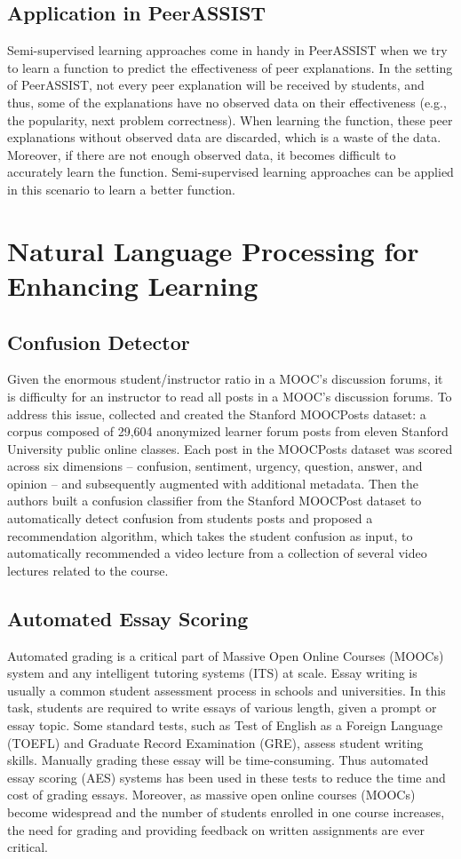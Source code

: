 \documentclass{article}
\begin{document}
\subsection{Application in PeerASSIST}
Semi-supervised learning approaches come in handy in PeerASSIST when
we try to learn a function to predict the effectiveness of peer
explanations. In the setting of PeerASSIST, not every peer explanation will be received by students,
and thus, some of the explanations have no observed data on their
effectiveness (e.g., the popularity, next problem correctness). When
learning the function, these peer explanations without observed data
are discarded, which is a waste of the data. Moreover, if there are not enough
observed data, it becomes difficult to accurately learn the
function. Semi-supervised learning approaches can be applied in this
scenario to learn a better function.

\section{Natural Language Processing for Enhancing Learning}
\subsection{Confusion Detector}
Given the enormous student/instructor ratio in a MOOC's discussion
forums, it is difficulty for an instructor to read all posts in a
MOOC's discussion forums. To address this issue, \cite{Agrawal2015-hp}
collected and created the Stanford MOOCPosts dataset: a corpus
composed of 29,604 anonymized learner forum posts from eleven Stanford
University public online classes. Each post in the MOOCPosts dataset
was scored across six dimensions -- confusion, sentiment, urgency,
question, answer, and opinion -- and subsequently augmented with
additional metadata. Then the authors built a confusion classifier from
the Stanford MOOCPost dataset to automatically detect confusion from
students posts and proposed a recommendation algorithm, which takes the
student confusion as input, to automatically recommended a
video lecture from a collection of several video lectures related to
the course.
\subsection{Automated Essay Scoring}
Automated grading is a critical part of Massive Open Online Courses (MOOCs) system and any intelligent tutoring systems (ITS) at scale. Essay writing is usually a common student assessment process in schools and universities. In this task, students are required to write essays of various length, given a prompt or essay topic. Some standard tests, such as Test of English as a Foreign Language (TOEFL) and Graduate Record Examination (GRE), assess student writing skills. Manually grading these essay will be time-consuming. Thus automated essay scoring (AES) systems has been used in these tests to reduce the time and cost of grading essays. Moreover, as massive open online courses (MOOCs) become widespread and the number of students enrolled in one course increases, the need for grading and providing feedback on written assignments are ever critical.
\end{document}
